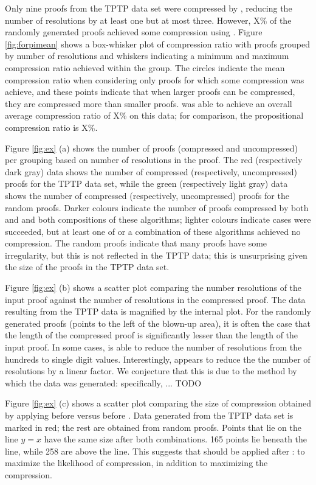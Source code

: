 {Only nine proofs from the TPTP data set were compressed by {\FORPI}, reducing the number of resolutions by at least one but at most three. However, X\% of the randomly generated proofs achieved some compression using {\FORPI}.
Figure \ref{fig:forpimean} shows a box-whisker plot of compression ratio with proofs grouped by number of resolutions and whiskers indicating a minimum and maximum compression ratio achieved within the group. The circles indicate the mean compression ratio when considering only proofs for which some compression was achieve, and these points indicate that when larger proofs can be compressed, they are compressed more than smaller proofs.
{\FORPI} was able to achieve an overall average compression ratio of X\% on this data; for comparison, the propositional {\RPI} compression ratio is X\%.

Figure \ref{fig:ex} (a) shows the number of proofs (compressed and uncompressed) per grouping based on number of resolutions in the proof. The red (respectively dark gray) data shows the number of compressed (respectively, uncompressed) proofs for the TPTP data set, while the green (respectively light gray) data shows the number of compressed (respectively, uncompressed) proofs for the random proofs. Darker colours indicate the number of proofs compressed by both {\FORPI} and {\GFOLU} and both compositions of these algorithms; lighter colours indicate cases were {\FORPI} succeeded, but at least one of {\GFOLU} or a combination of these algorithms achieved no compression. The random proofs indicate that many proofs have some irregularity, but this is not reflected in the TPTP data; this is unsurprising given the size of the proofs in the TPTP data set.

Figure \ref{fig:ex} (b) shows a scatter plot comparing the number resolutions of the input proof against the number of resolutions in the compressed proof. The data resulting from the TPTP data is magnified by the internal plot. For the randomly generated proofs (points to the left of the blown-up area), it is often the case that the length of the compressed proof is significantly lesser than the length of the input proof. In some cases, {\FORPI} is able to reduce the number of resolutions from the hundreds to single digit values. Interestingly, {\GFOLU} appears to reduce the the number of resolutions by a linear factor. We conjecture that this is due to the method by which the data was generated: specifically, ... TODO

Figure \ref{fig:ex} (c) shows a scatter plot comparing the size of compression obtained by applying {\FORPI} before {\GFOLU} versus {\GFOLU} before {\FORPI}. Data generated from the TPTP data set is marked in red; the rest are obtained from random proofs. Points that lie on the line $y=x$ have the same size after both combinations. 165 points lie beneath the line, while 258 are above the line. This suggests that {\GFOLU} should be applied after {\FORPI}: to maximize the likelihood of compression, in addition to maximizing the compression.

}
